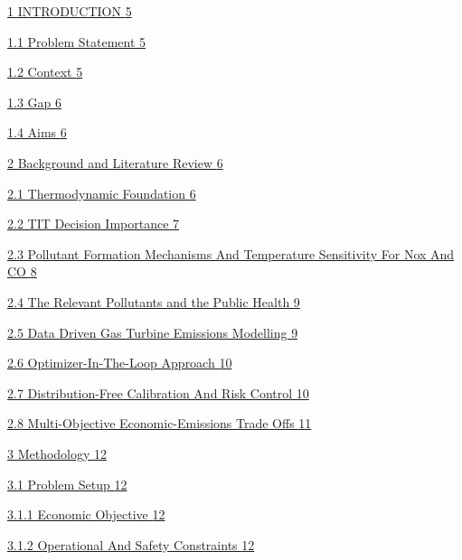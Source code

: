 \documentclass[11pt]{article}
\begin{document}
\hyperref[introduction]{1 INTRODUCTION \hyperref[introduction]{5}}

\hyperref[problem-statement]{1.1 Problem Statement
\hyperref[problem-statement]{5}}

\hyperref[context]{1.2 Context \hyperref[context]{5}}

\hyperref[gap]{1.3 Gap \hyperref[gap]{6}}

\hyperref[aims]{1.4 Aims \hyperref[aims]{6}}

\hyperref[background-and-literature-review]{2 Background and Literature
Review \hyperref[background-and-literature-review]{6}}

\hyperref[thermodynamic-foundation]{2.1 Thermodynamic Foundation
\hyperref[thermodynamic-foundation]{6}}

\hyperref[tit-decision-importance]{2.2 TIT Decision Importance
\hyperref[tit-decision-importance]{7}}

\hyperref[pollutant-formation-mechanisms-and-temperature-sensitivity-for-nox-and-co]{2.3
Pollutant Formation Mechanisms And Temperature Sensitivity For Nox And
CO
\hyperref[pollutant-formation-mechanisms-and-temperature-sensitivity-for-nox-and-co]{8}}

\hyperref[the-public-health]{2.4 The Relevant Pollutants and the Public
Health \hyperref[the-public-health]{9}}

\hyperref[data-driven-gas-turbine-emissions-modelling]{2.5 Data Driven
Gas Turbine Emissions Modelling
\hyperref[data-driven-gas-turbine-emissions-modelling]{9}}

\hyperref[optimizer-in-the-loop-approach]{2.6 Optimizer-In-The-Loop
Approach \hyperref[optimizer-in-the-loop-approach]{10}}

\hyperref[distribution-free-calibration-and-risk-control]{2.7
Distribution-Free Calibration And Risk Control
\hyperref[distribution-free-calibration-and-risk-control]{10}}

\hyperref[multi-objective-economic-emissions-trade-offs]{2.8
Multi-Objective Economic-Emissions Trade Offs
\hyperref[multi-objective-economic-emissions-trade-offs]{11}}

\hyperref[methodology]{3 Methodology \hyperref[methodology]{12}}

\hyperref[problem-setup]{3.1 Problem Setup \hyperref[problem-setup]{12}}

\hyperref[economic-objective]{3.1.1 Economic Objective
\hyperref[economic-objective]{12}}

\hyperref[operational-and-safety-constraints]{3.1.2 Operational And
Safety Constraints \hyperref[operational-and-safety-constraints]{12}}
\end{document}
